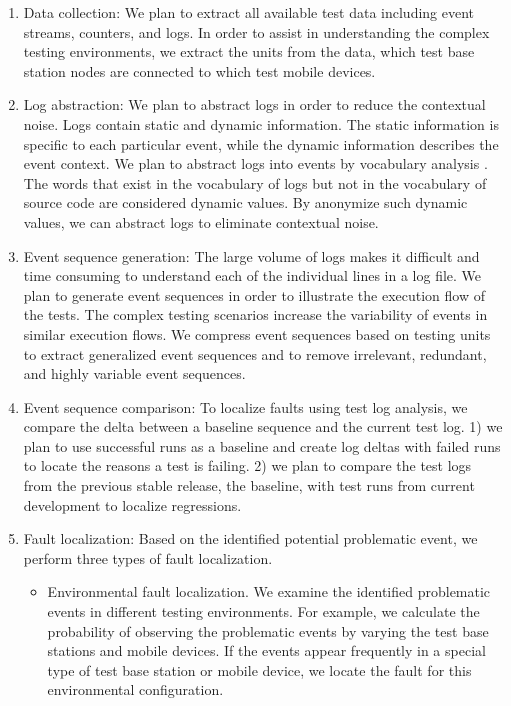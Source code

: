\begin{enumerate}

\item Data collection: We plan to extract all available test data including event streams, counters, and logs. In order to assist in understanding the complex testing environments, we extract the units from the data, \ie which test base station nodes are connected to which test mobile devices.

\item Log abstraction: We plan to abstract logs in order to reduce the contextual noise. Logs contain static and dynamic information. The static information is specific to each particular event, while the dynamic information describes the event context. We plan to abstract logs into events by vocabulary analysis . The words that exist in the vocabulary of logs but not in the vocabulary of source code are considered dynamic values. By anonymize such dynamic values, we can abstract logs to eliminate contextual noise.

\item Event sequence generation: The large volume of logs makes it difficult
and time consuming to understand each of the individual lines in a log file. We
plan to generate event sequences in order to illustrate the execution flow of
the tests. The complex testing scenarios increase the variability of events in
similar execution flows. We compress event sequences based on testing units
to extract generalized event sequences and to remove irrelevant, redundant, and
highly variable event sequences.

\item Event sequence comparison: To localize faults using test log analysis, we compare the delta between a baseline sequence and the current test log. 1) we plan to use successful runs as a baseline and create log deltas with failed runs to locate the reasons a test is failing. 2) we plan to compare the test logs from the previous stable release, the baseline, with test runs from current development to localize regressions.

\item Fault localization: Based on the identified potential problematic event, we perform three types of fault localization. 
	\begin{itemize}
		\item Environmental fault localization. We examine the identified problematic events in different testing environments. For example, we calculate the probability of observing the problematic events by varying the test base stations and mobile devices. If the events appear frequently in a special type of test base station or mobile device, we locate the fault for this environmental configuration.
		

\end{itemize}
\end{enumerate}
